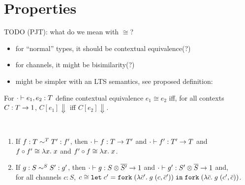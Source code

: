 
\section{Properties}
\label{sec:properties}

TODO (PJT): what do we mean with $\cong$?
\begin{itemize}
\item for ``normal'' types, it should be contextual equivalence(?)
\item for channels, it might be bisimilarity(?)
\item might be simpler with an LTS semantics, see proposed definition:
\end{itemize}

\begin{definition}
  For $\typingE[\CNil]{e_1, e_2} T$ define contextual equivalence $e_1 \cong e_2$
  iff, for all contexts $C : T \to \TUnit$, $C[e_1] \Downarrow$ iff $C[e_2] \Downarrow$. 
\end{definition}

\begin{lemma}[Conversions]~\\[-\baselineskip]
  \begin{enumerate}
  \item If $f : T \eqt T' : f'$,
  then $\typingE[\CNil]{f}{\TFun T{T'}}$
  and  $\typingE[\CNil]{f'}{\TFun {T'}T}$
  and  $f \circ f' \cong \ELam x x$
  and  $f' \circ f \cong \ELam x x$.
\item If $g : S \eqs S' : g'$,
  then $\typingE[\CNil]{g}{\TFun {\TPair {S} {\TDual{S'}}} \TUnit}$
  and $\typingE[\CNil]{g'}{\TFun {\TPair {S'} {\TDual{S}}} \TUnit}$
  and,\\
  for all channels $c : S$,  $c \cong \ELet{c'}{\EFork{( \ELam {\bar c'} g \; (c, \bar c')) }}{\EFork{( \ELam {\bar c} g \; (c', \bar c)) }} $. 
\end{enumerate}
\end{lemma}


